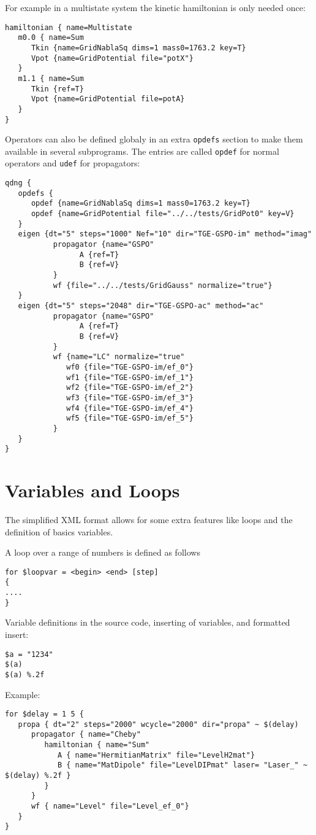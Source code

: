 \documentclass[a4paper,12pt]{scrbook}
\begin{document}
For example in a multistate system the kinetic hamiltonian
is only needed once:
\begin{verbatim}
hamiltonian { name=Multistate
   m0.0 { name=Sum
      Tkin {name=GridNablaSq dims=1 mass0=1763.2 key=T}
      Vpot {name=GridPotential file="potX"}
   }
   m1.1 { name=Sum
      Tkin {ref=T}
      Vpot {name=GridPotential file=potA}
   }
}
\end{verbatim}

Operators can also be defined globaly in an extra \verb|opdefs| section to make them
available in several subprograms. The entries are called \verb|opdef| for normal operators
and \verb|udef| for propagators:
\begin{verbatim}
qdng {
   opdefs {
      opdef {name=GridNablaSq dims=1 mass0=1763.2 key=T}
      opdef {name=GridPotential file="../../tests/GridPot0" key=V}
   }
   eigen {dt="5" steps="1000" Nef="10" dir="TGE-GSPO-im" method="imag"
           propagator {name="GSPO"
                 A {ref=T}
                 B {ref=V}
           }
           wf {file="../../tests/GridGauss" normalize="true"}
   }
   eigen {dt="5" steps="2048" dir="TGE-GSPO-ac" method="ac"
           propagator {name="GSPO"
                 A {ref=T}
                 B {ref=V}
           }
           wf {name="LC" normalize="true"
              wf0 {file="TGE-GSPO-im/ef_0"}
              wf1 {file="TGE-GSPO-im/ef_1"}
              wf2 {file="TGE-GSPO-im/ef_2"}
              wf3 {file="TGE-GSPO-im/ef_3"}
              wf4 {file="TGE-GSPO-im/ef_4"}
              wf5 {file="TGE-GSPO-im/ef_5"}
           }
   }
}
\end{verbatim}

\section{Variables and Loops}
The simplified XML format allows for some extra
features like loops and the definition of basics
variables.

A loop over a range of numbers is defined as follows
\begin{verbatim}
for $loopvar = <begin> <end> [step]
{
....
}
\end{verbatim}

Variable definitions in the source code,
inserting of variables, and formatted insert:
\begin{verbatim}
$a = "1234"
$(a)
$(a) %.2f
\end{verbatim}

Example:
\begin{verbatim}
for $delay = 1 5 {
   propa { dt="2" steps="2000" wcycle="2000" dir="propa" ~ $(delay)
      propagator { name="Cheby"
         hamiltonian { name="Sum"
            A { name="HermitianMatrix" file="LevelH2mat"}
            B { name="MatDipole" file="LevelDIPmat" laser= "Laser_" ~ $(delay) %.2f }
         }
      }
      wf { name="Level" file="Level_ef_0"}
   }
}
\end{verbatim}
\end{document}
